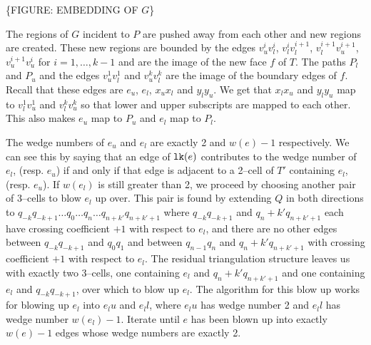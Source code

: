 \{FIGURE: EMBEDDING OF $G$\}

The regions of $G$ incident to $P$ are pushed away from each other and new regions are created.
These new regions are bounded by the edges $v_u^i v_l^i$, $v_l^i v_l^{i+1}$, $v_l^{i+1} v_u^{i+1}$, $v_u^{i+1} v_u^i$ for $i=1,\dots,k-1$ and are the image of the new face $f$ of $T$.
The paths $P_l$ and $P_u$ and the edges $v_u^1 v_l^1$ and $v_u^k v_l^k$ are the image of the boundary edges of $f$.
Recall that these edges are $e_u$, $e_l$, $x_u x_l$ and $y_l y_u$.
We get that $x_l x_u$ and $y_l y_u$ map to $v_l^1 v_u^1$ and $v_l^k v_u^k$ so that lower and upper subscripts are mapped to each other.
This also makes $e_u$ map to $P_u$ and $e_l$ map to $P_l$.

The wedge numbers of $e_u$ and $e_l$ are exactly 2 and $w(e)-1$ respectively.
We can see this by saying that an edge of $\texttt{lk}(e)$ contributes to the wedge number of $e_l$, (resp. $e_u$) if and only if that edge is adjacent to a 2--cell of $T'$ containing $e_l$, (resp. $e_u$).
If $w(e_l)$ is still greater than 2, we proceed by choosing another pair of 3--cells to blow $e_l$ up over.
This pair is found by extending $Q$ in both directions to $q_{-k}q_{-k+1}\dots q_0\dots q_n\dots q_{n+k'} q_{n+k'+1}$ where $q_{-k}q_{-k+1}$ and $q_n+k' q_{n+k'+1}$ each have crossing coefficient $+1$ with respect to $e_l$, and there are no other edges between $q_{-k}q_{-k+1}$ and $q_0 q_1$ and between $q_{n-1} q_{n}$ and $q_n+k' q_{n+k'+1}$ with crossing coefficient $+1$ with respect to $e_l$.
The residual triangulation structure leaves us with exactly two 3--cells, one containing $e_l$ and $q_n+k' q_{n+k'+1}$ and one containing $e_l$ and $q_{-k}q_{-k+1}$, over which to blow up $e_l$.
The algorithm for this blow up works for blowing up $e_l$ into $e_lu$ and $e_ll$, where $e_lu$ has wedge number 2 and $e_ll$ has wedge number $w(e_l)-1$.
Iterate until $e$ has been blown up into exactly $w(e)-1$ edges whose wedge numbers are exactly 2.

